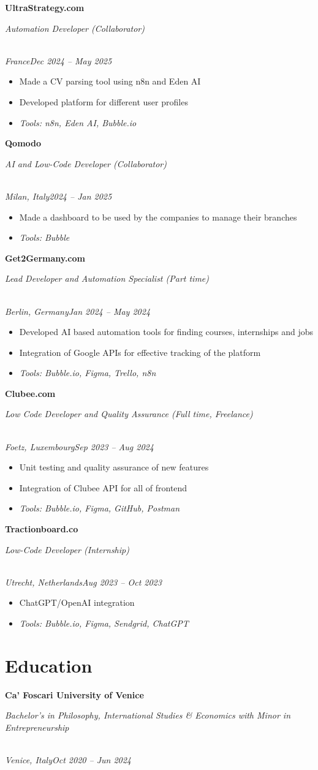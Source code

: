 \documentclass[a4paper,10pt]{article}
\newcommand{\role}[4]{\vspace{3pt}\noindent\hspace{0.6em}\parbox[t]{0.38\textwidth}{\raggedright\textbf{#1}}\hfill\parbox[t]{0.58\textwidth}{\raggedleft\textit{#2}}\\{\textit{#3}\hfill\textit{#4}}\vspace{1pt}}
\begin{document}
\role{UltraStrategy.com}{Automation Developer (Collaborator)}{France}{Dec 2024 -- May 2025}
\begin{itemize}
\item Made a CV parsing tool using n8n and Eden AI
\item Developed platform for different user profiles
\item \textit{Tools: n8n, Eden AI, Bubble.io}
\end{itemize}

\role{Qomodo}{AI and Low-Code Developer (Collaborator)}{Milan, Italy}{2024 -- Jan 2025}
\begin{itemize}
\item Made a dashboard to be used by the companies to manage their branches
\item \textit{Tools: Bubble}
\end{itemize}

\role{Get2Germany.com}{Lead Developer and Automation Specialist (Part time)}{Berlin, Germany}{Jan 2024 -- May 2024}
\begin{itemize}
\item Developed AI based automation tools for finding courses, internships and jobs
\item Integration of Google APIs for effective tracking of the platform
\item \textit{Tools: Bubble.io, Figma, Trello, n8n}
\end{itemize}

\role{Clubee.com}{Low Code Developer and Quality Assurance (Full time, Freelance)}{Foetz, Luxembourg}{Sep 2023 -- Aug 2024}
\begin{itemize}
\item Unit testing and quality assurance of new features
\item Integration of Clubee API for all of frontend
\item \textit{Tools: Bubble.io, Figma, GitHub, Postman}
\end{itemize}

\role{Tractionboard.co}{Low-Code Developer (Internship)}{Utrecht, Netherlands}{Aug 2023 -- Oct 2023}
\begin{itemize}
\item ChatGPT/OpenAI integration
\item \textit{Tools: Bubble.io, Figma, Sendgrid, ChatGPT}
\end{itemize}

\section{Education}
\role{Ca' Foscari University of Venice}{Bachelor's in Philosophy, International Studies \& Economics with Minor in Entrepreneurship}{Venice, Italy}{Oct 2020 -- Jun 2024}
\end{document}

